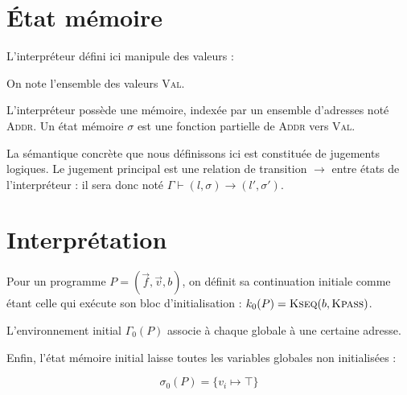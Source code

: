 \section{État mémoire}
\label{sec:sigma}

L'interpréteur défini ici manipule des valeurs :


On note l'ensemble des valeurs \textsc{Val}.

\begin{definition}
L'interpréteur possède une mémoire, indexée par un ensemble d'adresses noté
\textsc{Addr}. Un état mémoire $σ$ est une fonction partielle de \textsc{Addr}
vers \textsc{Val}.
\end{definition}


\begin{definition}
La sémantique concrète que nous définissons ici est constituée de jugements
logiques. Le jugement principal est une relation de transition $\rightarrow$
entre états de l'interpréteur : il sera donc noté $Γ ⊢ (l, σ) \rightarrow (l', σ')$.
\end{definition}

\section{Interprétation}

\begin{definition}

  Pour un programme $P = (\vec{f},\vec{v},b)$, on définit sa continuation
  initiale comme étant celle qui exécute son bloc d'initialisation : $k_0 (P) =
  \textsc{Kseq}(b, \textsc{Kpass})$.

  L'environnement initial $Γ_0(P)$ associe à chaque globale à une certaine
  adresse.

  Enfin, l'état mémoire initial laisse toutes les variables globales non
  initialisées :

  \[ σ_0(P) = \{ v_i ↦ \top \} \]

\end{definition}

